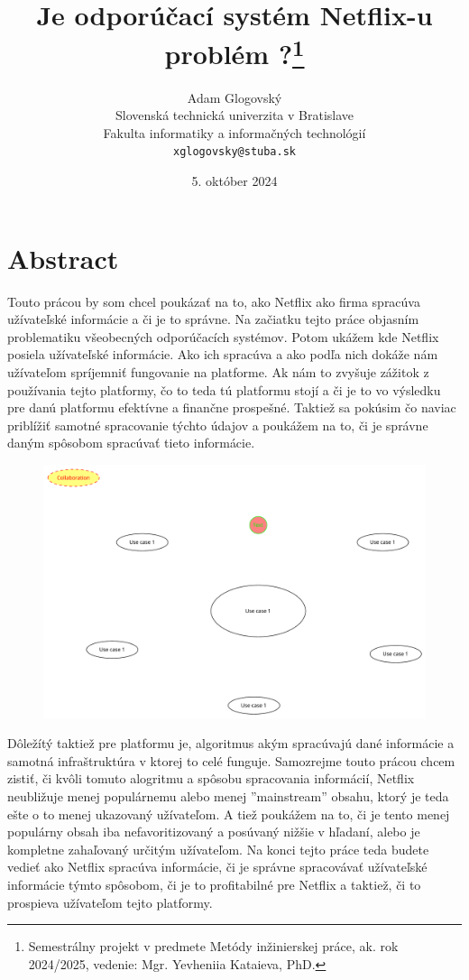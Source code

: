 \documentclass[10pt,twocolumn,twoside,slovak,a4paper]{article}
\title{Je odporúčací systém Netflix-u problém ?\thanks{Semestrálny projekt v predmete Metódy inžinierskej práce, ak. rok 2024/2025, vedenie: Mgr. Yevheniia Kataieva, PhD.}}
\author{Adam Glogovský\\[2pt]
	{\small Slovenská technická univerzita v Bratislave}\\
	{\small Fakulta informatiky a informačných technológií}\\
	{\small \texttt{xglogovsky@stuba.sk}}}
\date{\small 5. október 2024}
\begin{document}
\maketitle

\section*{Abstract}
Touto prácou by som chcel poukázať na to, ako Netflix ako firma spracúva užívateľské informácie a či je to správne. Na začiatku tejto práce objasním problematiku všeobecných odporúčacích systémov. Potom ukážem kde Netflix posiela užívateľské informácie. Ako ich spracúva a ako podľa nich dokáže nám užívateľom spríjemniť fungovanie na platforme. Ak nám to zvyšuje zážitok z používania tejto platformy, čo to teda tú platformu stojí a či je to vo výsledku pre danú platformu efektívne a finančne prospešné. Taktiež sa pokúsim čo naviac priblížiť samotné spracovanie týchto údajov a poukážem na to, či je správne daným spôsobom spracúvať tieto informácie.\cite{amatriain2015recommender}
\begin{figure}[h]
	\centering
	\includegraphics[scale=0.2]{diagram.pdf}
\end{figure}
Dôležítý taktiež pre platformu je, algoritmus akým spracúvajú dané informácie a samotná infraštruktúra v ktorej to celé funguje. Samozrejme touto prácou chcem zistiť, či kvôli tomuto alogritmu a spôsobu spracovania informácií, Netflix neubližuje menej populárnemu alebo menej ''mainstream'' obsahu, ktorý je teda ešte o to menej ukazovaný užívateľom. A tiež poukážem na to, či je tento menej populárny obsah iba nefavoritizovaný a posúvaný nižšie v hľadaní, alebo je kompletne zahaľovaný určitým užívateľom. Na konci tejto práce teda budete vedieť ako Netflix spracúva informácie, či je správne spracovávať užívateľské informácie týmto spôsobom, či je to profitabilné pre Netflix a taktiež, či to prospieva užívateľom tejto platformy.
\end{document}
